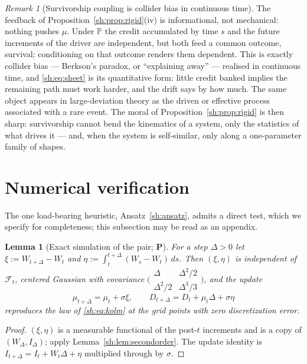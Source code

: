 \documentclass[11pt]{article}
\numberwithin{equation}{section}
\theoremstyle{plain}
\newtheorem{lemma}[theorem]{Lemma}
\theoremstyle{definition}
\theoremstyle{remark}
\newtheorem{remark}[theorem]{Remark}
\newcommand{\PP}{\mathbb{P}}
\newcommand{\Fc}{\mathcal{F}}
\begin{document}
\begin{remark}[Survivorship coupling is collider bias in continuous time]
\label{sh:rem:collider}
The feedback of Proposition~\ref{sh:prop:rigid}(iv) is informational, not
mechanical: nothing pushes $\mu$. Under $\PP$ the credit accumulated by
time $s$ and the future increments of the driver are independent, but
both feed a common outcome, survival; conditioning on that outcome
renders them dependent. This is exactly collider bias --- Berkson's
paradox, or ``explaining away'' --- realised in continuous time, and
\eqref{sh:eq:sheet} is its quantitative form: little credit banked
implies the remaining path must work harder, and the drift says by how
much. The same object appears in large-deviation theory as the driven or
effective process associated with a rare event. The moral of
Proposition~\ref{sh:prop:rigid} is then sharp: survivorship cannot bend
the kinematics of a system, only the statistics of what drives it ---
and, when the system is self-similar, only along a one-parameter family
of shapes.
\end{remark}

\section{Numerical verification}\label{app:numerics}

\label{sh:sub:numerics}

The one load-bearing heuristic, Ansatz~\ref{sh:ansatz}, admits a direct
test, which we specify for completeness; this subsection may be read as an
appendix.

\begin{lemma}[Exact simulation of the pair; \textbf{P}]\label{sh:lem:exact}
For a step $\Delta>0$ let $\xi:=W_{t+\Delta}-W_t$ and
$\eta:=\int_t^{t+\Delta}(W_s-W_t)\,ds$. Then $(\xi,\eta)$ is independent of
$\Fc_t$, centered Gaussian with covariance
$\bigl(\begin{smallmatrix}\Delta&\Delta^2/2\\
\Delta^2/2&\Delta^3/3\end{smallmatrix}\bigr)$, and the update
\[
\mu_{t+\Delta}=\mu_t+\sigma\xi,\qquad
D_{t+\Delta}=D_t+\mu_t\Delta+\sigma\eta
\]
reproduces the law of \eqref{sh:eq:kolm} at the grid points with zero
discretization error.
\end{lemma}

\begin{proof}
$(\xi,\eta)$ is a measurable functional of the post-$t$ increments and is a
copy of $(W_\Delta,I_\Delta)$; apply Lemma~\ref{sh:lem:secondorder}. The
update identity is
$I_{t+\Delta}=I_t+W_t\Delta+\eta$ multiplied through by $\sigma$.
\end{proof}
\end{document}
